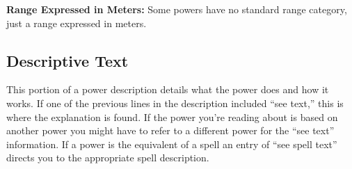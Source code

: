 


\textbf{Range Expressed in Meters:} Some powers have no standard range category, just a range expressed in meters.



% 





\subsection{Descriptive Text}
This portion of a power description details what the power does and how it works. If one of the previous lines in the description included ``see text,'' this is where the explanation is found. If the power you're reading about is based on another power you might have to refer to a different power for the ``see text'' information. If a power is the equivalent of a spell an entry of ``see spell text'' directs you to the appropriate spell description.

